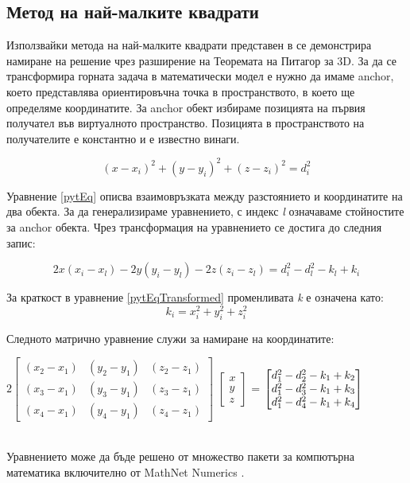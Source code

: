 \subsection{Метод на най-малките квадрати} \label{squares_algorithm}

Използвайки метода на най-малките квадрати представен в \cite{leastsq} се демонстрира намиране на решение чрез разширение на Теоремата на Питагор за 3D. За да се трансформира горната задача в математически модел е нужно да имаме anchor\cite{leastsq2}, което представлява ориентировъчна точка в пространството, в което ще определяме координатите. За anchor обект избираме позицията на първия получател във виртуалното пространство. Позицията в пространството на получателите е константно и е известно винаги.


\begin{equation} \label{pytEq}
   (x-x_i)^2 + (y-y_i)^2 + (z-z_i)^2=d_i^2
\end{equation}

Уравнение \ref{pytEq} описва взаимовръзката между разстоянието и координатите на два обекта. За да генерализираме уравнението, с индекс \textit{l} означаваме стойностите за anchor обекта. Чрез трансформация на уравнението се достига до следния запис:

\begin{equation} \label{pytEqTransformed}
  2 x (x_i - x_l) - 2 y (y_i - y_l) - 2  z  (z_i - z_l) = d^2_i - d^2_l - k_l + k_i
\end{equation}

За краткост в уравнение \ref{pytEqTransformed} променливата \textit{k} е означена като: 
\begin{equation} \label{kdesc}
    k_i= x^2_i + y^2_i + z^2_i
\end{equation}

Следното матрично уравнение служи за намиране на координатите:\\

\centerline{
    $
    2 \begin{bmatrix}
        (x_2-x_1) & (y_2 - y_1) & (z_2 - z_1)\\
        (x_3-x_1) & (y_3 - y_1) & (z_3 - z_1)\\
        (x_4-x_1) & (y_4 - y_1) & (z_4 - z_1)
    \end{bmatrix}
    $
    $
    \begin{bmatrix}
        x\\y\\z
    \end{bmatrix}
    $
    =
    $
    \begin{bmatrix}
        d^2_1 - d^2_2 - k_1 + k_2\\
        d^2_1 - d^2_3 - k_1 + k_3\\
        d^2_1 - d^2_4 - k_1 + k_4\\
    \end{bmatrix}\\
    $
}\\

Уравнението може да бъде решено от множество пакети за компютърна математика включително от MathNet Numerics \cite{numerics}.